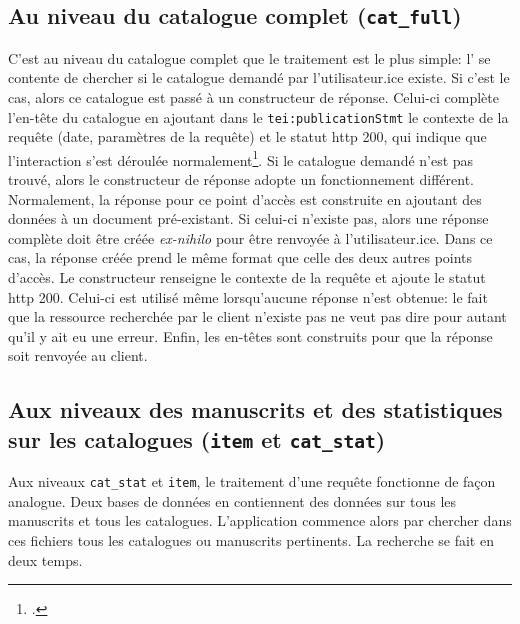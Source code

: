 \subsection{Au niveau du catalogue complet (\texttt{cat\_full})}
C'est au niveau du catalogue complet que le traitement est le plus simple: l'\api{} se contente de chercher si le catalogue demandé par l'utilisateur.ice existe. Si c'est le cas, alors ce catalogue est passé à un constructeur de réponse. Celui-ci complète l'en-tête du catalogue en ajoutant dans le \texttt{tei:publicationStmt} le contexte de la requête (date, paramètres de la requête) et le statut \gls{http} 200, qui indique que l'interaction s'est déroulée normalement\footcite[§15.3.1 200 \textit{OK}]{fielding_http_2022}. Si le catalogue demandé n'est pas trouvé, alors le constructeur de réponse adopte un fonctionnement différent. Normalement, la réponse pour ce point d'accès est construite en ajoutant des données à un document pré-existant. Si celui-ci n'existe pas, alors une réponse complète doit être créée \textit{ex-nihilo} pour être renvoyée à l'utilisateur.ice. Dans ce cas, la réponse créée prend le même format que celle des deux autres points d'accès. Le constructeur renseigne le contexte de la requête et ajoute le statut \gls{http} 200. Celui-ci est utilisé même lorsqu'aucune réponse n'est obtenue: le fait que la ressource recherchée par le client n'existe pas ne veut pas dire pour autant qu'il y ait eu une erreur. Enfin, les en-têtes sont construits pour que la réponse soit renvoyée au client.


\subsection{Aux niveaux des manuscrits et des statistiques sur les catalogues (\texttt{item} et \texttt{cat\_stat})}
Aux niveaux \texttt{cat\_stat} et \texttt{item}, le traitement d'une requête fonctionne de façon analogue. Deux bases de données en \json{} contiennent des données sur tous les manuscrits et tous les catalogues. L'application commence alors par chercher dans ces fichiers tous les catalogues ou manuscrits pertinents. La recherche se fait en deux temps.

